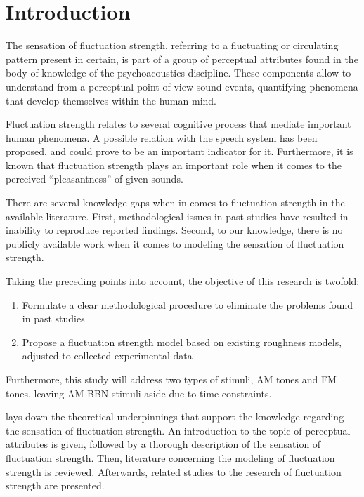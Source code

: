 \documentclass[../main.tex]{subfiles}
\begin{document}
\chapter{Introduction}
\label{cha:introduction}

The sensation of fluctuation strength, referring to a fluctuating or circulating
pattern present in certain, is part of a group of perceptual attributes found
in the body of knowledge of the psychoacoustics discipline. These components
allow to understand from a perceptual point of view sound events, quantifying
phenomena that develop themselves within the human mind.

Fluctuation strength relates to several cognitive process that mediate
important human phenomena. A possible relation with the speech system has been
proposed, and could prove to be an important indicator for it. Furthermore, it
is known that fluctuation strength plays an important role when it comes to the
perceived ``pleasantness'' of given sounds.

There are several knowledge gaps when in comes to fluctuation strength in the
available literature. First, methodological issues in past studies have resulted
in inability to reproduce reported findings. Second, to our knowledge, there is
no publicly available work when it comes to modeling the sensation of
fluctuation strength.

Taking the preceding points into account, the objective of this research is
twofold:
\begin{enumerate}
  \item Formulate a clear methodological procedure to eliminate the problems
    found in past studies
  \item Propose a fluctuation strength model based on existing roughness models,
    adjusted to collected experimental data
\end{enumerate}

Furthermore, this study will address two types of stimuli, \gls{AM} tones and
\gls{FM} tones, leaving \gls{AM} \gls{BBN} stimuli aside due to time
constraints.

 lays down the theoretical underpinnings that support the
knowledge regarding the sensation of fluctuation strength. An introduction to
the topic of perceptual attributes is given, followed by a thorough description
of the sensation of fluctuation strength. Then, literature concerning the
modeling of fluctuation strength is reviewed. Afterwards, related studies to
the research of fluctuation strength are presented.
\end{document}
